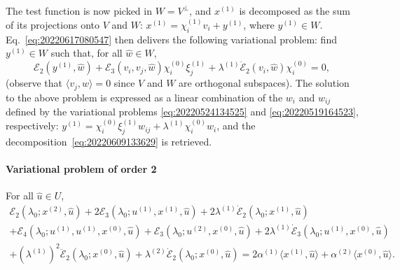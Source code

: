 \documentclass[12pt, final]{scrartcl}
\theoremstyle{definition}
\newcommand{\E}{\mathcal E}
\newcommand{\order}[2][1]{#2^{(#1)}}
\begin{document}
The test function is now picked in $W = V^\perp$, and $\order[1]x$ is
decomposed as the sum of its projections onto $V$ and $W$:
$\order[1]x = \order[1]{χ_i} v_i + \order[1]{y}$, where $\order[1]y \in
W$. Eq.~\eqref{eq:20220617080547} then delivers the following variational
problem: find $\order[1]y \in W$ such that, for all $\hat{w} \in W$,
\begin{equation}
  \E_2(\order[1]y, \hat{w}) + \E_3(v_i, v_j, \hat{w}) \order[0]{χ_i} \order[1]{ξ_j} + \order[1]\lambda \dot{\E}_2(v_i, \hat{w}) \order[0]{χ_i} = 0,
\end{equation}
(observe that $〈 v_j, \hat{w} 〉 = 0$ since $V$ and $W$ are orthogonal
subspaces). The solution to the above problem is expressed as a linear
combination of the $w_i$ and $w_{ij}$ defined by the variational problems
\eqref{eq:20220524134525} and \eqref{eq:20220519164523}, respectively:
$\order[1]y = \order[0]{χ_i} \order[1]{ξ_j} w_{i j} + \order[1]\lambda \order[0]{χ_i}
w_i$, and the decomposition~\eqref{eq:20220609133629} is retrieved.

\paragraph{Variational problem of order 2} For all $\hat{u} \in U$,
\begin{multline*}
    \E_2(\lambda_0; \order[2]x, \hat{u})
    + 2\E_3(\lambda_0; \order[1]u, \order[1]x, \hat{u})
    + 2 \order[1]\lambda \dot{\E}_2(\lambda_0; \order[1]x, \hat{u})\\
    + \E_4(\lambda_0; \order[1]u, \order[1]u, \order[0]x, \hat{u})
    + \E_3(\lambda_0; \order[2]u, \order[0]x, \hat{u})
    + 2\order[1]\lambda \dot{\E}_3(\lambda_0; \order[1]u, \order[0]x, \hat{u})\\
    + ( \order[1]\lambda )^2 \ddot{\E}_2(\lambda_0; \order[0]x, \hat{u})
    + \order[2]\lambda \dot{\E}_2(\lambda_0; \order[0]x, \hat{u})
    = 2 \order[1]α 〈 \order[1]x, \hat{u} 〉
    + \order[2]α 〈 \order[0]x, \hat{u} 〉.
\end{multline*}
\end{document}
